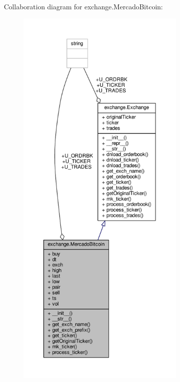 Collaboration diagram for exchange.\+Mercado\+Bitcoin\+:\nopagebreak
\begin{figure}[H]
\begin{center}
\leavevmode
\includegraphics[height=550pt]{classexchange_1_1_mercado_bitcoin__coll__graph}
\end{center}
\end{figure}
